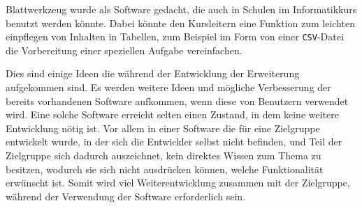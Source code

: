 Blattwerkzeug wurde als Software gedacht, die auch in Schulen im Informatikkurs benutzt werden könnte. Dabei könnte den Kursleitern eine Funktion zum leichten einpflegen von Inhalten in Tabellen, zum Beispiel im Form von einer \texttt{CSV}-Datei die Vorbereitung einer speziellen Aufgabe vereinfachen.

Dies sind einige Ideen die während der Entwicklung der Erweiterung aufgekommen sind. Es werden weitere Ideen und mögliche Verbesserung der bereits vorhandenen Software aufkommen, wenn diese von Benutzern verwendet wird. 
Eine solche Software erreicht selten einen Zustand, in dem keine weitere Entwicklung nötig ist. Vor allem in einer Software die für eine Zielgruppe entwickelt wurde, in der sich die Entwickler selbst nicht befinden, und Teil der Zielgruppe sich dadurch auszeichnet, kein direktes Wissen zum Thema zu besitzen, wodurch sie sich nicht ausdrücken können, welche Funktionalität erwünscht ist. Somit wird viel Weiterentwicklung zusammen mit der Zielgruppe, während der Verwendung der Software erforderlich sein.

